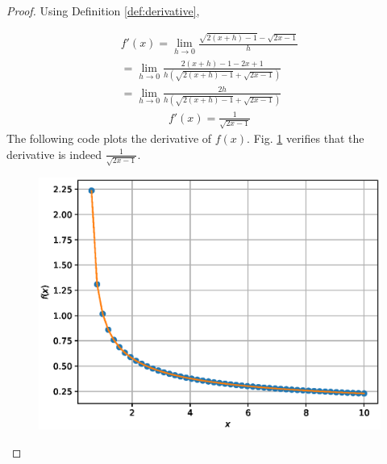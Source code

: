 \documentclass[journal,12pt,twocolumn]{IEEEtran}
\begin{document}
\begin{proof}

Using Definition \ref{def:derivative},
  
\begin{align}
f'(x)=\lim_{h \to 0} {\frac{\sqrt{2(x+h)-1}-\sqrt{2x-1}}{h}}\\
     =\lim_{h \to 0} {\frac{2(x+h)-1-2x+1}{h(\sqrt{2(x+h)-1}+\sqrt{2x-1})}} \\
=\lim_{h \to 0} {\frac{2h}{h(\sqrt{2(x+h)-1}+\sqrt{2x-1})}}
\end{align}
\begin{align}
f'(x)=\frac{1}{\sqrt{2x-1}}
\end{align}
The following code plots the derivative of $f(x)$. Fig. \ref{fig:1} verifies that the derivative is indeed $\frac{1}{\sqrt{2x-1}}$.

%
\begin{figure}[!ht]
\begin{center}
\includegraphics[width=\columnwidth]{./figs/1.eps}
\end{center}

\label{fig:1}	
\end{figure}
\end{proof}
%
%
%
\end{document}
